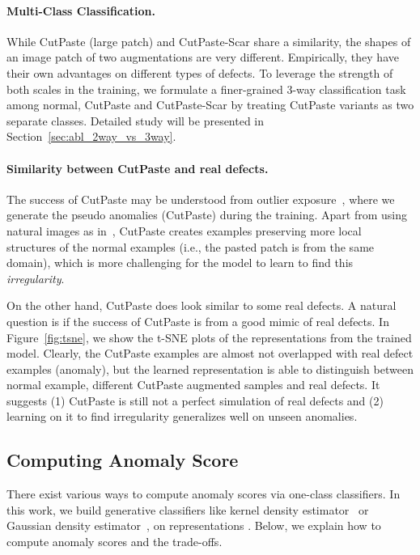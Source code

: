 \documentclass[final]{cvpr}
\begin{document}
\paragraph{Multi-Class Classification.} 
While CutPaste (large patch) and CutPaste-Scar share a similarity, the shapes of an image patch of two augmentations are very different. 
Empirically, they have their own advantages on different types of defects. To leverage the strength of both scales in the training,
we formulate a finer-grained 3-way classification task among normal, CutPaste and CutPaste-Scar by treating CutPaste variants as two separate classes.  Detailed study will be presented in Section~\ref{sec:abl_2way_vs_3way}.  

\paragraph{Similarity between CutPaste and real defects.}
The success of CutPaste may be understood from  outlier exposure~\cite{hendrycks2018deep}, where we generate the pseudo anomalies (CutPaste) during the training. Apart from using natural images as in~\cite{hendrycks2018deep}, CutPaste creates examples preserving more local structures of the normal examples (i.e., the pasted patch is from the same domain), which is more challenging for the model to 
learn to find this \emph{irregularity}. 

On the other hand, CutPaste does look similar to some real defects. A natural question is if the success of CutPaste is from a good mimic of real defects. In Figure~\ref{fig:tsne}, we show the t-SNE plots of the representations from the trained model. Clearly, the CutPaste examples are almost not overlapped with real defect examples (anomaly), but the learned representation is able to distinguish between normal example, different CutPaste augmented samples and real defects. It suggests (1) CutPaste is still not a perfect simulation of real defects and (2) learning on it to find irregularity generalizes well on unseen anomalies. 

 


\subsection{Computing Anomaly Score}
\label{sec:method_score}
There exist various ways to compute anomaly scores via one-class classifiers. In this work, we build generative classifiers like kernel density estimator~\cite{sohn2020learning} or Gaussian density estimator~\cite{rippel2020modeling}, on representations . Below, we explain how to compute anomaly scores and the trade-offs.
\end{document}
